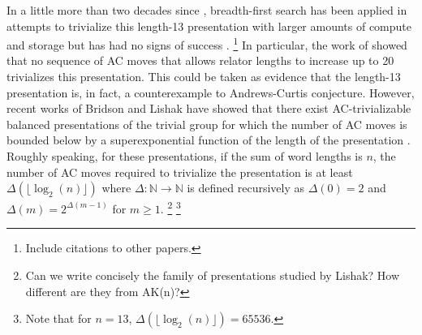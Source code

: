 In a little more than two decades since \cite{genetic, bfs-ac}, breadth-first search has been applied in attempts to trivialize this length-13 presentation with larger amounts of compute and storage but has had no signs of success \cite{Panteleev-Ushakov}. 
\footnote{Include citations to other papers.}
In particular, the work of \cite{Panteleev-Ushakov} showed that no sequence of AC moves that allows relator lengths to increase up to 20 trivializes this presentation. This could be taken as  evidence that the length-13 presentation is, in fact, a counterexample to Andrews-Curtis conjecture. However, recent works of Bridson and Lishak have showed that there exist AC-trivializable balanced presentations of the trivial group for which the number of AC moves is bounded below by a superexponential function of the length of the presentation \cite{Bridson, Lishak}.
Roughly speaking, for these presentations, if the sum of word lengths is $n$, the number of AC moves required to trivialize the presentation is at least $\Delta (\lfloor \log_2 (n) \rfloor)$ where $\Delta \colon \mathbb{N} \to \mathbb{N}$ is defined recursively as $\Delta(0) = 2$ and $\Delta (m) = 2^{\Delta(m-1)}$ for $m \geq 1$.
\footnote{Can we write concisely the family of presentations studied by Lishak? How different are they from AK(n)? }
\footnote{Note that for $n=13$, $\Delta (\lfloor \log_2 (n) \rfloor) = 65536$.}
\newline

